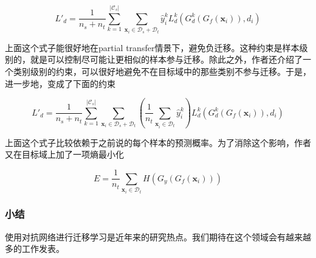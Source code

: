 \begin{equation}
	L'_d=\frac{1}{n_s+n_t} \sum_{k=1}^{|\mathcal{C}_s|} \sum_{\mathbf{x}_i \in \mathcal{D}_s + \mathcal{D}_t}^{} \hat{y}^k_i L^k_d(G^k_d(G_f(\mathbf{x}_i)),d_i)
\end{equation}

上面这个式子能很好地在partial transfer情景下，避免负迁移。这种约束是样本级别的，就是可以控制尽可能让更相似的样本参与迁移。除此之外，作者还介绍了一个类别级别的约束，可以很好地避免不在目标域中的那些类别不参与迁移。于是，进一步地，变成了下面的约束

\begin{equation}
	L'_d=\frac{1}{n_s+n_t} \sum_{k=1}^{|\mathcal{C}_s|} \sum_{\mathbf{x}_i \in \mathcal{D}_s + \mathcal{D}_t}^{} (\frac{1}{n_t} \sum_{\mathbf{x}_i^{} \in \mathcal{D}_t}\hat{y}^k_i) L^k_d(G^k_d(G_f(\mathbf{x}_i)),d_i)
\end{equation}

上面这个式子比较依赖于之前说的每个样本的预测概率。为了消除这个影响，作者又在目标域上加了一项熵最小化

\begin{equation}
	E=\frac{1}{n_t} \sum_{\mathbf{x}_i \in \mathcal{D}_t} H(G_y(G_f(\mathbf{x}_i)))
\end{equation}

\subsubsection{小结}

使用对抗网络进行迁移学习是近年来的研究热点。我们期待在这个领域会有越来越多的工作发表。